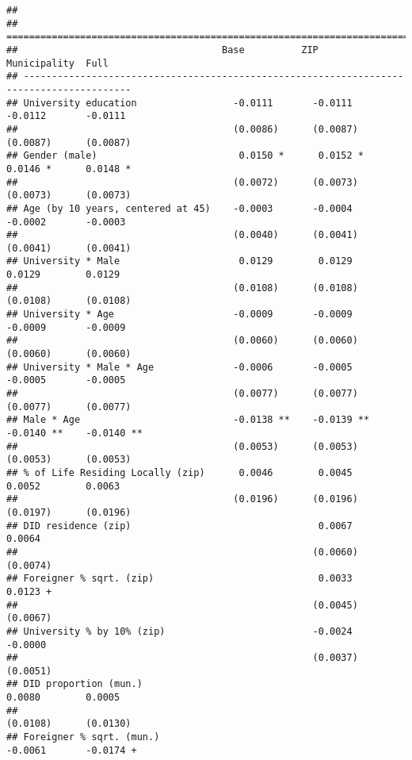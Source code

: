 \documentclass[
]{article}
\begin{document}
\begin{verbatim}
## 
## =========================================================================================
##                                    Base          ZIP           Municipality  Full        
## -----------------------------------------------------------------------------------------
## University education                 -0.0111       -0.0111       -0.0112       -0.0111   
##                                      (0.0086)      (0.0087)      (0.0087)      (0.0087)  
## Gender (male)                         0.0150 *      0.0152 *      0.0146 *      0.0148 * 
##                                      (0.0072)      (0.0073)      (0.0073)      (0.0073)  
## Age (by 10 years, centered at 45)    -0.0003       -0.0004       -0.0002       -0.0003   
##                                      (0.0040)      (0.0041)      (0.0041)      (0.0041)  
## University * Male                     0.0129        0.0129        0.0129        0.0129   
##                                      (0.0108)      (0.0108)      (0.0108)      (0.0108)  
## University * Age                     -0.0009       -0.0009       -0.0009       -0.0009   
##                                      (0.0060)      (0.0060)      (0.0060)      (0.0060)  
## University * Male * Age              -0.0006       -0.0005       -0.0005       -0.0005   
##                                      (0.0077)      (0.0077)      (0.0077)      (0.0077)  
## Male * Age                           -0.0138 **    -0.0139 **    -0.0140 **    -0.0140 **
##                                      (0.0053)      (0.0053)      (0.0053)      (0.0053)  
## % of Life Residing Locally (zip)      0.0046        0.0045        0.0052        0.0063   
##                                      (0.0196)      (0.0196)      (0.0197)      (0.0196)  
## DID residence (zip)                                 0.0067                      0.0064   
##                                                    (0.0060)                    (0.0074)  
## Foreigner % sqrt. (zip)                             0.0033                      0.0123 + 
##                                                    (0.0045)                    (0.0067)  
## University % by 10% (zip)                          -0.0024                     -0.0000   
##                                                    (0.0037)                    (0.0051)  
## DID proportion (mun.)                                             0.0080        0.0005   
##                                                                  (0.0108)      (0.0130)  
## Foreigner % sqrt. (mun.)                                         -0.0061       -0.0174 + 

\end{verbatim}
\end{document}
